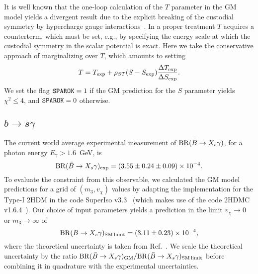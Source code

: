 \documentclass[11pt]{article}
\begin{document}
It is well known that the one-loop calculation of the $T$ parameter in the GM model yields a divergent result due to the explicit breaking of the custodial symmetry by hypercharge gauge interactions~\cite{Gunion:1990dt}.  In a proper treatment $T$ acquires a counterterm, which must be set, e.g., by specifying the energy scale at which the custodial symmetry in the scalar potential is exact.  Here we take the conservative approach of marginalizing over $T$, which amounts to setting 
\begin{equation}
	T = T_{\rm exp} + \rho_{ST} (S-S_{\rm exp})\frac{\Delta T_{\rm exp}}{\Delta S_{\rm exp}}.
\end{equation}
We set the flag ${\tt SPAROK} = 1$ if the GM prediction for the $S$ parameter yields $\chi^2 \leq 4$, and ${\tt SPAROK} = 0$ otherwise.


\subsection{$b \to s \gamma$}

The current world average experimental measurement of ${\rm BR}(\bar B \to X_s \gamma)$, for a photon energy $E_{\gamma} > 1.6$~GeV, is~\cite{Beringer:1900zz}
\begin{equation}
	{\rm BR}(\bar B \to X_s \gamma)_{\rm exp} = (3.55 \pm 0.24 \pm 0.09) \times 10^{-4}.
\end{equation}
To evaluate the constraint from this observable, we calculated the GM model predictions for a grid of $(m_3, v_{\chi})$ values by adapting the implementation for the Type-I 2HDM in the code SuperIso v3.3~\cite{SuperIso} (which makes use of the code 2HDMC v1.6.4~\cite{2HDMC}).  Our choice of input parameters yields a prediction in the limit $v_{\chi} \to 0$ or $m_3 \to \infty$ of
\begin{equation}
	{\rm BR}(\bar B \to X_s \gamma)_{\rm SM \, limit} = (3.11 \pm 0.23) \times 10^{-4},
\end{equation}
where the theoretical uncertainty is taken from Ref.~\cite{Misiak:2006zs}.  We scale the theoretical uncertainty by the ratio ${\rm BR}(\bar B \to X_s \gamma)_{\rm GM}/{\rm BR}(\bar B \to X_s \gamma)_{\rm SM \, limit}$ before combining it in quadrature with the experimental uncertainties.
\end{document}
